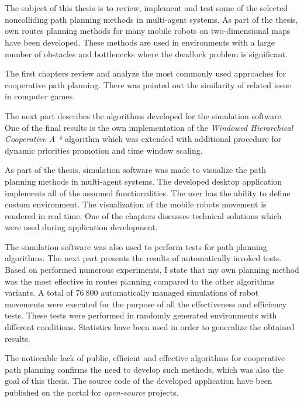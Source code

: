 \\

\\

\begin{singlespacing}

The subject of this thesis is to review, implement and test some of the selected noncolliding path planning methods in multi-agent systems.
As part of the thesis, own routes planning methods for many mobile robots on two-dimensional maps have been developed.
These methods are used in environments with a large number of obstacles and bottlenecks where the deadlock problem is significant.

The first chapters review and analyze the most commonly used approaches for cooperative path planning.
There was pointed out the similarity of related issue in computer games.

The next part describes the algorithms developed for the simulation software.
One of the final results is the own implementation of the {\it Windowed Hierarchical Cooperative A *} algorithm which was extended with additional procedure for dynamic priorities promotion and time window scaling.

As part of the thesis, simulation software was made to visualize the path planning methods in multi-agent systems.
The developed desktop application implements all of the assumed functionalities.
The user has the ability to define custom environment. The visualization of the mobile robots movement is rendered in real time.
One of the chapters discusses technical solutions which were used during application development.

The simulation software was also used to perform tests for path planning algorithms.
The next part presents the results of automatically invoked tests.
Based on performed numerous experiments, I state that my own planning method was the most effective in routes planning compared to the other algorithms variants.
A total of $76\ 800$ automatically managed simulations of robot movements were executed for the purpose of all the effectiveness and efficiency tests.
These tests were performed in randomly generated environments with different conditions.
Statistics have been used in order to generalize the obtained results.


The noticeable lack of public, efficient and effective algorithms for cooperative path planning confirms the need to develop such methods, which was also the goal of this thesis. The source code of the developed application have been published on the portal for {\it open-source} projects.


\end{singlespacing}
